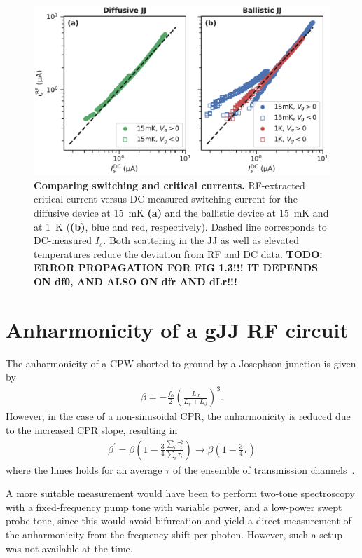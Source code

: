 \begin{figure}
	\centering
	\includegraphics[width=0.583\linewidth]{chapter-gJJ-CPR/figs/Figure3}
	\caption{
		\textbf{Comparing switching and critical currents.}
		RF-extracted critical current versus DC-measured switching current for the diffusive device at \SI{15}{\milli\kelvin} \textbf{(a)} and the ballistic device at \SI{15}{\milli\kelvin} and at \SI{1}{\kelvin} (\textbf{(b)}, blue and red, respectively).
		Dashed line corresponds to DC-measured $I_s$.
		Both scattering in the JJ as well as elevated temperatures reduce the deviation from RF and DC data.
		\textbf{TODO: ERROR PROPAGATION FOR FIG 1.3!!! IT DEPENDS ON df0, AND ALSO ON dfr AND dLr!!!}
	}
	\label{fig:figure3}
\end{figure}

\section{Anharmonicity of a gJJ RF circuit}

The anharmonicity of a CPW shorted to ground by a Josephson junction is given by~\cite{wilsonPhotonGenerationElectromagnetic2010b,zhouHighgainWeaklyNonlinear2014}
\begin{align}
\beta=-\frac{f_0}{2} \left(\frac{L_J}{L_r+L_J}\right)^3.
\label{eq:anharmonicity}
\end{align}
%
However, in the case of a non-sinusoidal CPR, the anharmonicity is reduced due to the increased CPR slope, resulting in
\begin{align}
\beta^\prime = \beta \left( 1-\frac{3}{4}\frac{\sum_i\tau_i^2}{\sum_i\tau_i}\right) \rightarrow \beta \left( 1-\frac{3}{4}\tau \right)
\label{eq:anh_nonsin}
\end{align}
%
where the limes holds for an average $\tau$ of the ensemble of transmission channels~\cite{kringhojAnharmonicitySuperconductingQubit2018}.

A more suitable measurement would have been to perform two-tone spectroscopy with a fixed-frequency pump tone with variable power, and a low-power swept probe tone, since this would avoid bifurcation and yield a direct measurement of the anharmonicity from the frequency shift per photon.
%
However, such a setup was not available at the time.


